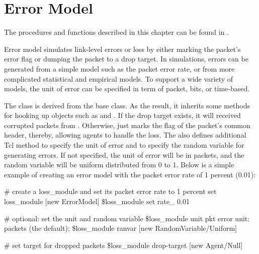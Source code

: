%
%
\chapter{Error Model}
\label{chap:error_model}

The procedures and functions described in this chapter can be found in
.

Error model simulates link-level errors or loss by either marking the
packet's error flag or dumping the packet to a drop target.  In
simulations, errors can be generated from a simple model such as the
packet error rate, or from more complicated statistical and empirical models.
To support a wide variety of models, the unit of error can be specified
in term of packet, bits, or time-based.

The  class is derived from the  base
class.  As the result, it inherits some methods for hooking up objects
such as  and .  If the drop target
exists, it will received corrupted packets from .
Otherwise,  just marks the  flag of the
packet's common header, thereby, allowing agents to handle the loss.
The  also defines additional Tcl method  to
specify the unit of error and  to specify the random
variable for generating errors.  If not specified, the unit of error
will be in packets, and the random variable will be uniform distributed
from 0 to 1.  Below is a simple example of creating an error model with
the packet error rate of 1 percent (0.01):
\begin{program}
        # create a loss_module and set its packet error rate to 1 percent
        set loss_module [new ErrorModel]
        \$loss_module set rate_ 0.01

        # {\cf optional:  set the unit and random variable}
        \$loss_module unit pkt            \; error unit: packets (the default);
        \$loss_module ranvar [new RandomVariable/Uniform]

        # {\cf set target for dropped packets}
        \$loss_module drop-target [new Agent/Null]
\end{program}

